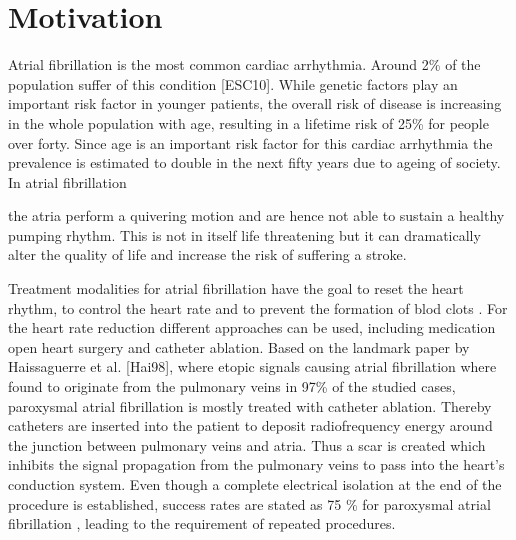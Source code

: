\documentclass[type=dr, dr=rernat, accentcolor=tud7b,colorbacktitle, bigchapter, openright, twoside, 12pt ]{tudthesis}
\begin{document}
% 
% 
% 


\chapter*{Motivation}

Atrial fibrillation is the most common cardiac arrhythmia. Around 2\% of the population suffer of this condition [ESC10]. 
While genetic factors play an important risk factor in younger patients, the overall risk of disease is increasing in the whole population 
with age, resulting in a lifetime risk of 25\% for people over forty. Since age is an important risk factor for this cardiac arrhythmia the 
prevalence is estimated to double in the next fifty years due to ageing of society. In atrial fibrillation 

the atria perform a quivering 
motion and are hence not able to sustain a healthy 
pumping rhythm. This is not in itself life threatening but it can dramatically alter the quality of life and increase the risk of 
suffering a stroke.\newline

Treatment modalities for atrial fibrillation have the goal to reset the heart rhythm, to control the heart rate and to prevent the formation 
of blod clots \cite{CE09}. For the heart rate reduction different approaches can be used, including medication open heart surgery and catheter 
ablation. Based on the landmark paper by Haissaguerre et al. [Hai98], where etopic signals causing atrial fibrillation where found to originate 
from the pulmonary veins in 97\% of the studied cases, paroxysmal atrial fibrillation is mostly treated with catheter ablation. Thereby 
catheters are inserted into the patient to deposit radiofrequency energy around the junction between pulmonary veins and atria. 
Thus a scar is created which inhibits the signal propagation from the pulmonary veins to pass into the heart's 
conduction system. Even though a complete electrical isolation at the end of the procedure is established, success rates 
are stated as 75 \% for paroxysmal atrial fibrillation \cite{Cap10} \cite{Sto}, leading to the requirement of repeated procedures. \newline
\end{document}

